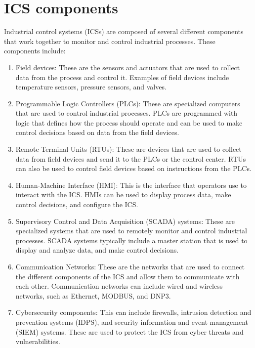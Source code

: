 \section{ICS components}
\label{sec:ics_components}
Industrial control systems (ICSs) are composed of several different components that work together to monitor and control industrial processes. These components include:
\begin{enumerate}

\item Field devices: These are the sensors and actuators that are used to collect data from the process and control it. Examples of field devices include temperature sensors, pressure sensors, and valves.

\item Programmable Logic Controllers (PLCs): These are specialized computers that are used to control industrial processes. PLCs are programmed with logic that defines how the process should operate and can be used to make control decisions based on data from the field devices.

\item Remote Terminal Units (RTUs): These are devices that are used to collect data from field devices and send it to the PLCs or the control center. RTUs can also be used to control field devices based on instructions from the PLCs.

\item Human-Machine Interface (HMI): This is the interface that operators use to interact with the ICS. HMIs can be used to display process data, make control decisions, and configure the ICS.

\item Supervisory Control and Data Acquisition (SCADA) systems: These are specialized systems that are used to remotely monitor and control industrial processes. SCADA systems typically include a master station that is used to display and analyze data, and make control decisions.

\item Communication Networks: These are the networks that are used to connect the different components of the ICS and allow them to communicate with each other. Communication networks can include wired and wireless networks, such as Ethernet, MODBUS, and DNP3.

\item Cybersecurity components: This can include firewalls, intrusion detection and prevention systems (IDPS), and security information and event management (SIEM) systems. These are used to protect the ICS from cyber threats and vulnerabilities.

\end{enumerate}

